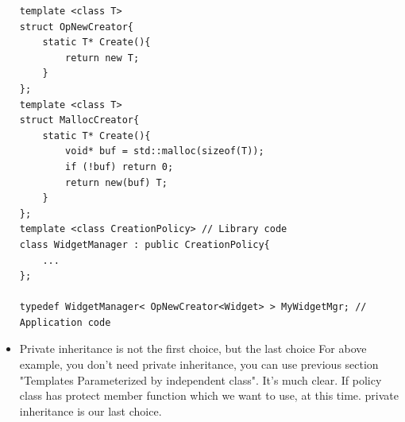 \documentclass[a4paper,11pt,twoside]{book}
\begin{document}
\begin{itemize}
\begin{lstlisting}[numbers=none]
template <class T>
struct OpNewCreator{
	static T* Create(){
		return new T;
	}
};
template <class T>
struct MallocCreator{
	static T* Create(){
		void* buf = std::malloc(sizeof(T));
		if (!buf) return 0;
		return new(buf) T;
	}
}; 
template <class CreationPolicy> // Library code
class WidgetManager : public CreationPolicy{
	...
}; 

typedef WidgetManager< OpNewCreator<Widget> > MyWidgetMgr; // Application code
\end{lstlisting}	
	
	\item Private inheritance is not the first choice, but the last choice For above example, you don't need private inheritance, you can use previous section "Templates Parameterized by independent class". It's much clear. If policy class has protect member function which we want to use, at this time. private inheritance is our last choice. 
	
\end{itemize}
\end{document}
